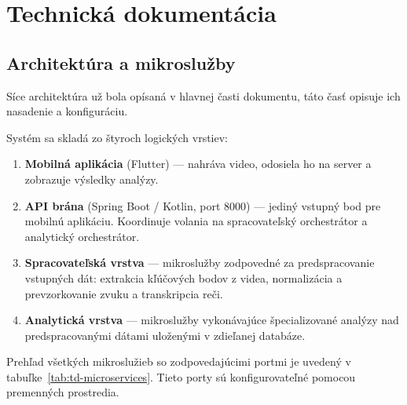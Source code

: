 \chapter{Technická dokumentácia \label{cha:technicalDocumentation}}
\pagestyle{plain}

\section{Architektúra a mikroslužby}

Síce architektúra už bola opísaná v hlavnej časti dokumentu, táto časť opisuje ich nasadenie a konfiguráciu.

Systém sa skladá zo štyroch logických vrstiev:

\begin{enumerate}
    \item \textbf{Mobilná aplikácia} (Flutter) — nahráva video, odosiela ho na server a zobrazuje výsledky analýzy.
    \item \textbf{API brána} (Spring Boot / Kotlin, port 8000) — jediný vstupný bod pre mobilnú aplikáciu. Koordinuje volania na spracovateľský orchestrátor a analytický orchestrátor.
    \item \textbf{Spracovateľská vrstva} — mikroslužby zodpovedné za predspracovanie vstupných dát: extrakcia kľúčových bodov z videa, normalizácia a prevzorkovanie zvuku a transkripcia reči.
    \item \textbf{Analytická vrstva} — mikroslužby vykonávajúce špecializované analýzy nad predspracovanými dátami uloženými v zdieľanej databáze.
\end{enumerate}

Prehľad všetkých mikroslužieb so zodpovedajúcimi portmi je uvedený v tabuľke~\ref{tab:td-microservices}.
Tieto porty sú konfigurovateľné pomocou premenných prostredia.

